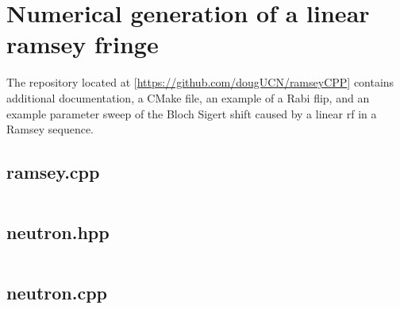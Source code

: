 
\chapter{Numerical generation of a linear ramsey fringe}\label{appx:ramsey_numerical}


The repository located at [\url{https://github.com/dougUCN/ramseyCPP}] contains additional documentation, a CMake file, an example of a Rabi flip, and an example parameter sweep of the Bloch Sigert shift caused by a linear \acrshort*{rf} in a Ramsey sequence. 


\cite{numerical_recipes}


\section{ramsey.cpp}

\inputminted{cpp}{code_snippets/ramsey.cpp}

\section{neutron.hpp}

\inputminted{cpp}{code_snippets/neutron.hpp}

\section{neutron.cpp}

\inputminted{cpp}{code_snippets/neutron.cpp}